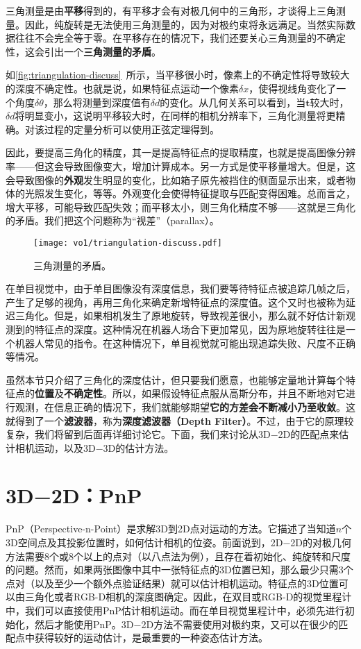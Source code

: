 三角测量是由\textbf{平移}得到的，有平移才会有对极几何中的三角形，才谈得上三角测量。因此，纯旋转是无法使用三角测量的，因为对极约束将永远满足。当然实际数据往往不会完全等于零。在平移存在的情况下，我们还要关心三角测量的不确定性，这会引出一个\textbf{三角测量的矛盾}。

如\autoref{fig:triangulation-discuss}~所示，当平移很小时，像素上的不确定性将导致较大的深度不确定性。也就是说，如果特征点运动一个像素$\delta x$，使得视线角变化了一个角度$\delta \theta$，那么将测量到深度值有$\delta d$的变化。从几何关系可以看到，当$\bm{t}$较大时，$\delta d$将明显变小，这说明平移较大时，在同样的相机分辨率下，三角化测量将更精确。对该过程的定量分析可以使用正弦定理得到。

因此，要提高三角化的精度，其一是提高特征点的提取精度，也就是提高图像分辨率——但这会导致图像变大，增加计算成本。另一方式是使平移量增大。但是，这会导致图像的\textbf{外观}发生明显的变化，比如箱子原先被挡住的侧面显示出来，或者物体的光照发生变化，等等。外观变化会使得特征提取与匹配变得困难。总而言之，增大平移，可能导致匹配失效；而平移太小，则三角化精度不够——这就是三角化的矛盾。我们把这个问题称为“视差”（parallax）。

\begin{figure}[!ht]
	\centering
	\texttt{[image: vo1/triangulation-discuss.pdf]}
	\caption{三角测量的矛盾。}
	\label{fig:triangulation-discuss}
\end{figure}

在单目视觉中，由于单目图像没有深度信息，我们要等待特征点被追踪几帧之后，产生了足够的视角，再用三角化来确定新增特征点的深度值。这个又时也被称为延迟三角化\textsuperscript{\cite{Davison2003}}。但是，如果相机发生了原地旋转，导致视差很小，那么就不好估计新观测到的特征点的深度。这种情况在机器人场合下更加常见，因为原地旋转往往是一个机器人常见的指令。在这种情况下，单目视觉就可能出现追踪失败、尺度不正确等情况。

虽然本节只介绍了三角化的深度估计，但只要我们愿意，也能够定量地计算每个特征点的\textbf{位置}及\textbf{不确定性}。所以，如果假设特征点服从高斯分布，并且不断地对它进行观测，在信息正确的情况下，我们就能够期望\textbf{它的方差会不断减小乃至收敛}。这就得到了一个\textbf{滤波器}，称为\textbf{深度滤波器（Depth Filter）}。不过，由于它的原理较复杂，我们将留到后面再详细讨论它。下面，我们来讨论从3D−2D的匹配点来估计相机运动，以及3D−3D的估计方法。

\section{3D−2D：PnP}
PnP（Perspective-n-Point）是求解3D到2D点对运动的方法。它描述了当知道$n$个3D空间点及其投影位置时，如何估计相机的位姿。前面说到，2D−2D的对极几何方法需要8个或8个以上的点对（以八点法为例），且存在着初始化、纯旋转和尺度的问题。然而，如果两张图像中其中一张特征点的3D位置已知，那么最少只需3个点对（以及至少一个额外点验证结果）就可以估计相机运动。特征点的3D位置可以由三角化或者RGB-D相机的深度图确定。因此，在双目或RGB-D的视觉里程计中，我们可以直接使用PnP估计相机运动。而在单目视觉里程计中，必须先进行初始化，然后才能使用PnP。3D−2D方法不需要使用对极约束，又可以在很少的匹配点中获得较好的运动估计，是最重要的一种姿态估计方法。

